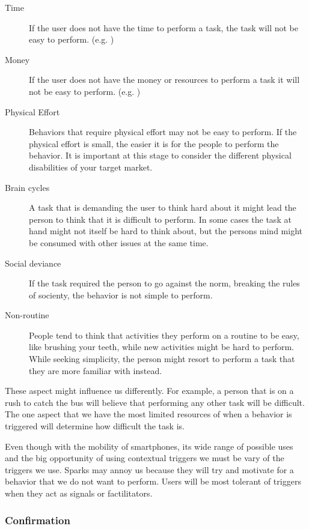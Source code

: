 \begin{description}
  \item[Time] If the user does not have the time to perform a task, the task will not be easy to perform. (e.g. )
  \item[Money] If the user does not have the money or resources to perform a task it will not be easy to perform. (e.g. )
  \item[Physical Effort] Behaviors that require physical effort may not be easy to perform. If the physical effort is small, the easier it is for the people to perform the behavior. It is important at this stage to consider the different physical disabilities of your target market.
  \item[Brain cycles] A task that is demanding the user to think hard about it might lead the person to think that it is difficult to perform. In some cases the task at hand might not itself be hard to think about, but the persons mind might be consumed with other issues at the same time.
  \item[Social deviance] If the task required the person to go against the norm, breaking the rules of socienty, the behavior is not simple to perform.
  \item[Non-routine] People tend to think that activities they perform on a routine to be easy, like brushing your teeth, while new activities might be hard to perform. While seeking simplicity, the person might resort to perform a task that they are more familiar with instead.
\end{description}

These aspect might influence us differently. For example, a person that is on a rush to catch the bus will believe that performing any other task will be difficult. The one aspect that we have the most limited resources of when a behavior is triggered will determine how difficult the task is.

Even though with the mobility of smartphones, its wide range of possible uses and the big opportunity of using contextual triggers we must be vary of the triggers we use. Sparks may annoy us because they will try and motivate for a behavior that we do not want to perform. Users will be most tolerant of triggers when they act as signals or factilitators.

\subsubsection{Confirmation}

